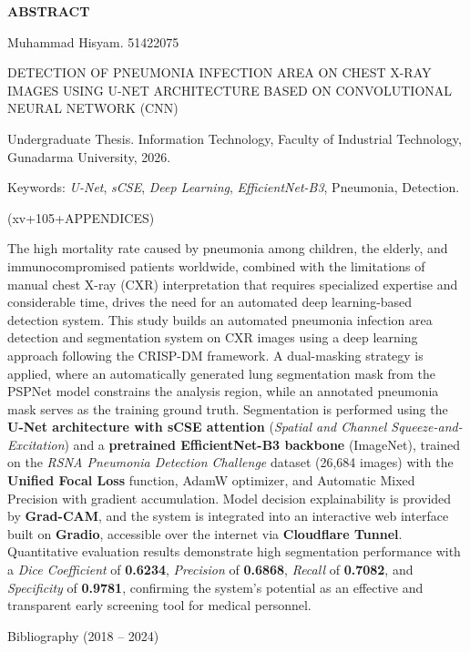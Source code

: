 \documentclass[12pt,a4paper,oneside]{book}
\newcommand{\addfrontmattertoc}[1]{%
  \addtocontents{toc}{\protect\contentsline{chapter}{\textnormal{#1}}{\textnormal{\thepage}}{}}%
}
\newenvironment{skripsiabstract}[1]
  {\begin{center}
    \bfseries\fontsize{14pt}{14pt}\selectfont\MakeUppercase{#1}
   \end{center}
   \vspace{2\baselineskip}
   \singlespacing
   \fontsize{12pt}{12pt}\selectfont}
  {\par\vspace{\baselineskip}}
\begin{document}
\newpage
\thispagestyle{plain}

\begin{skripsiabstract}{Abstract}
\addfrontmattertoc{ABSTRACT}

\noindent Muhammad Hisyam. 51422075

\vspace{\baselineskip}

\noindent DETECTION OF PNEUMONIA INFECTION AREA ON CHEST X-RAY IMAGES USING U-NET ARCHITECTURE BASED ON CONVOLUTIONAL NEURAL NETWORK (CNN)

\vspace{\baselineskip}

\noindent Undergraduate Thesis. Information Technology, Faculty of Industrial Technology, Gunadarma University, 2026.

\vspace{\baselineskip}

\noindent Keywords: \textit{U-Net}, \textit{sCSE}, \textit{Deep Learning}, \textit{EfficientNet-B3}, Pneumonia, Detection.

\vspace{\baselineskip}

\noindent (xv+105+APPENDICES)

\vspace{\baselineskip}

\noindent The high mortality rate caused by pneumonia among children, the elderly, and immunocompromised patients worldwide, combined with the limitations of manual chest X-ray (CXR) interpretation that requires specialized expertise and considerable time, drives the need for an automated deep learning-based detection system. This study builds an automated pneumonia infection area detection and segmentation system on CXR images using a deep learning approach following the CRISP-DM framework. A dual-masking strategy is applied, where an automatically generated lung segmentation mask from the PSPNet model constrains the analysis region, while an annotated pneumonia mask serves as the training ground truth. Segmentation is performed using the \textbf{U-Net architecture with sCSE attention} (\textit{Spatial and Channel Squeeze-and-Excitation}) and a \textbf{pretrained EfficientNet-B3 backbone} (ImageNet), trained on the \textit{RSNA Pneumonia Detection Challenge} dataset (26,684 images) with the \textbf{Unified Focal Loss} function, AdamW optimizer, and Automatic Mixed Precision with gradient accumulation. Model decision explainability is provided by \textbf{Grad-CAM}, and the system is integrated into an interactive web interface built on \textbf{Gradio}, accessible over the internet via \textbf{Cloudflare Tunnel}. Quantitative evaluation results demonstrate high segmentation performance with a \textit{Dice Coefficient} of \textbf{0.6234}, \textit{Precision} of \textbf{0.6868}, \textit{Recall} of \textbf{0.7082}, and \textit{Specificity} of \textbf{0.9781}, confirming the system's potential as an effective and transparent early screening tool for medical personnel.

\noindent Bibliography (2018 -- 2024)

\end{skripsiabstract}
\end{document}
